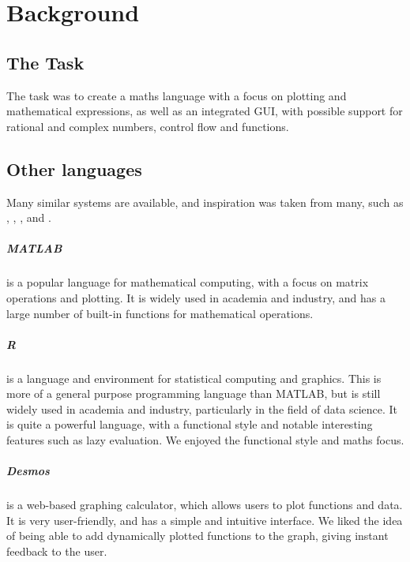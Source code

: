\documentclass[a4paper, oneside, 11pt]{report}
\begin{document}
\chapter{Background}\label{ch:background}

\section{The Task}\label{sec:the-task}

The task was to create a maths language with a focus on plotting and mathematical expressions, as well as an 
integrated GUI\@, with possible support for rational and complex numbers, control flow and functions.

\section{Other languages}\label{sec:other-languages}

Many similar systems are available, and inspiration was taken from many, such as \citet{matlab}, \citet{rlang}, \citet{Desmos:2023}, 
\citet{haskell} and \citet{python}.

\paragraph{MATLAB} is a popular language for mathematical computing, with a focus on matrix operations and plotting.
It is widely used in academia and industry, and has a large number of built-in functions for mathematical operations.

\paragraph{R} is a language and environment for statistical computing and graphics.
This is more of a general purpose programming language than MATLAB, but is still widely used in academia and 
industry, particularly in the field of data science.
It is quite a powerful language, with a functional style and notable interesting features such as lazy evaluation.
We enjoyed the functional style and maths focus.

\paragraph{Desmos} is a web-based graphing calculator, which allows users to plot functions and data.
It is very user-friendly, and has a simple and intuitive interface.
We liked the idea of being able to add dynamically plotted functions to the graph, giving instant feedback to the user.
\end{document}

